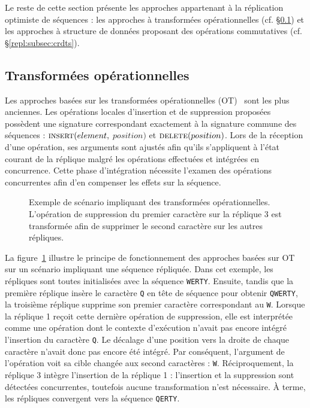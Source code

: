 Le reste de cette section présente les approches appartenant à la réplication
optimiste de séquences : les approches à transformées opérationnelles (cf.
§\ref{repl:subsec:ot}) et les approches à structure de données proposant des
opérations commutatives (cf. §\ref{repl:subsec:crdts}).

\subsection{Transformées opérationnelles}
\label{repl:subsec:ot}

Les approches basées sur les transformées opérationnelles
(OT)~\cite{sun1998operational, sun2009contextbased} sont les plus anciennes. Les
opérations locales d'insertion et de suppression proposées possèdent une
signature correspondant exactement à la signature commune des séquences :
$\textsc{insert}(element,$ $position)$ et $\textsc{delete}(position)$. Lors de
la réception d'une opération, ses arguments sont ajustés afin qu'ils
s'appliquent à l'état courant de la réplique malgré les opérations effectuées et
intégrées en concurrence. Cette phase d'intégration nécessite l'examen des
opérations concurrentes afin d'en compenser les effets sur la séquence.


\begin{figure}
  \centering
  
  \caption[Exemple de transformées opérationnelles] {\label{repl:fig:otexample}
    Exemple de scénario impliquant des transformées opérationnelles. L'opération
    de suppression du premier caractère sur la réplique 3 est transformée afin
    de supprimer le second caractère sur les autres répliques.}
\end{figure}

La figure~\ref{repl:fig:otexample} illustre le principe de fonctionnement des
approches basées sur OT sur un scénario impliquant une séquence répliquée. Dans
cet exemple, les répliques sont toutes initialisées avec la séquence
\texttt{WERTY}. Ensuite, tandis que la première réplique insère le caractère
\texttt{Q} en tête de séquence pour obtenir \texttt{QWERTY}, la troisième
réplique supprime son premier caractère correspondant au \texttt{W}. Lorsque la
réplique 1 reçoit cette dernière opération de suppression, elle est interprétée
comme une opération dont le contexte d'exécution n'avait pas encore intégré
l'insertion du caractère \texttt{Q}. Le décalage d'une position vers la droite
de chaque caractère n'avait donc pas encore été intégré. Par conséquent,
l'argument de l'opération voit sa cible changée aux second caractères :
\texttt{W}.  Réciproquement, la réplique 3 intègre l'insertion de la réplique 1
: l'insertion et la suppression sont détectées concurrentes, toutefois aucune
transformation n'est nécessaire. À terme, les répliques convergent vers la
séquence \texttt{QERTY}. %

